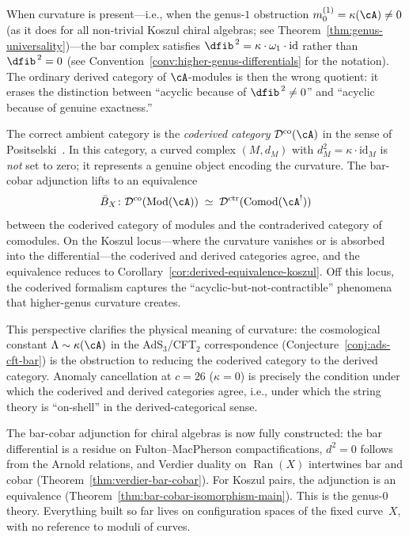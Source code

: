 \begin{remark}\label{rem:curvature-coderived}
When curvature is present---i.e., when the genus-$1$ obstruction
$m_0^{(1)} = \kappa(\cA) \neq 0$ (as it does for all non-trivial
Koszul chiral algebras; see
Theorem~\ref{thm:genus-universality})---the bar complex satisfies
$\dfib^{\,2} = \kappa \cdot \omega_1 \cdot \mathrm{id}$ rather than $\dfib^{\,2} = 0$
(see Convention~\ref{conv:higher-genus-differentials} for the notation).
The ordinary derived category of $\cA$-modules is then the wrong
quotient: it erases the distinction between ``acyclic because of
$\dfib^{\,2} \neq 0$'' and ``acyclic because of genuine exactness.''

The correct ambient category is the \emph{coderived category}
$\mathcal{D}^{\mathrm{co}}(\cA)$ in the sense of
Positselski~\cite{Positselski11}.  In this category, a curved complex
$(M, d_M)$ with $d_M^2 = \kappa \cdot \mathrm{id}_M$ is
\emph{not} set to zero; it represents a genuine object encoding the
curvature.  The bar-cobar adjunction lifts to an equivalence
\[
\bar{B}_X \colon
\mathcal{D}^{\mathrm{co}}(\operatorname{Mod}(\cA))
\;\simeq\;
\mathcal{D}^{\mathrm{ctr}}(\operatorname{Comod}(\cA^!))
\]
between the coderived category of modules and the contraderived category
of comodules.  On the Koszul locus---where the curvature vanishes or
is absorbed into the differential---the coderived and derived categories
agree, and the equivalence reduces to
Corollary~\ref{cor:derived-equivalence-koszul}.  Off this locus, the
coderived formalism captures the ``acyclic-but-not-contractible''
phenomena that higher-genus curvature creates.

This perspective clarifies the physical meaning of curvature: the
cosmological constant $\Lambda \sim \kappa(\cA)$ in the AdS$_3$/CFT$_2$
correspondence (Conjecture~\ref{conj:ads-cft-bar}) is the obstruction
to reducing the coderived category to the derived category.  Anomaly
cancellation at $c = 26$ ($\kappa = 0$) is precisely the condition
under which the coderived and derived categories agree, i.e., under
which the string theory is ``on-shell'' in the derived-categorical
sense.
\end{remark}

The bar-cobar adjunction for chiral algebras is now fully constructed:
the bar differential is a residue on Fulton--MacPherson
compactifications, $d^2 = 0$ follows from the Arnold relations, and
Verdier duality on $\operatorname{Ran}(X)$ intertwines bar and cobar
(Theorem~\ref{thm:verdier-bar-cobar}).  For Koszul pairs, the
adjunction is an equivalence (Theorem~\ref{thm:bar-cobar-isomorphism-main}).
This is the genus-$0$ theory.  Everything built so far lives on
configuration spaces of the fixed curve~$X$, with no reference to
moduli of curves.

